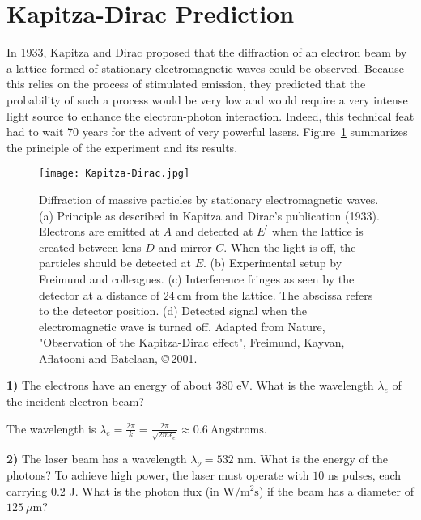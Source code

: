 
\section{Kapitza-Dirac Prediction}

\noindent In 1933, Kapitza and Dirac proposed that the diffraction of an electron beam by a lattice formed of stationary electromagnetic waves could be observed. Because this relies on the process of stimulated emission, they predicted that the probability of such a process would be very low and would require a very intense light source to enhance the electron-photon interaction. Indeed, this technical feat had to wait 70 years for the advent of very powerful lasers. Figure~\ref{fig:Kapitza-Dirac} summarizes the principle of the experiment and its results.

\begin{figure}[H]
    \centering
    \texttt{[image: Kapitza-Dirac.jpg]}
    \caption{Diffraction of massive particles by stationary electromagnetic waves. (a) Principle as described in Kapitza and Dirac's publication (1933). Electrons are emitted at $A$ and detected at $E^{\prime}$ when the lattice is created between lens $D$ and mirror $C$. When the light is off, the particles should be detected at $E$. (b) Experimental setup by Freimund and colleagues. (c) Interference fringes as seen by the detector at a distance of $24 \mathrm{~cm}$ from the lattice. The abscissa refers to the detector position. (d) Detected signal when the electromagnetic wave is turned off. Adapted from Nature, "Observation of the Kapitza-Dirac effect", Freimund, Kayvan, Aflatooni and Batelaan, \copyright \,2001.}
    \label{fig:Kapitza-Dirac}
\end{figure}

\noindent \textbf{1)} The electrons have an energy of about $380$ eV. What is the wavelength $\lambda_e$ of the incident electron beam?\\

\begin{breakbox}
    \noindent The wavelength is $\boxed{\lambda_e = \frac{2\pi}{k} = \frac{2\pi}{\sqrt{2m\epsilon_e}}\approx 0.6\ \text{Angstroms}.}$
\end{breakbox}

\medskip

\noindent \textbf{2)} The laser beam has a wavelength $\lambda_\nu=532$ nm. What is the energy of the photons? To achieve high power, the laser must operate with $10$ ns pulses, each carrying $0.2$ J. What is the photon flux (in $\mathrm{W/m^2 s}$) if the beam has a diameter of $125\ \mu \mathrm{m}$?\\


